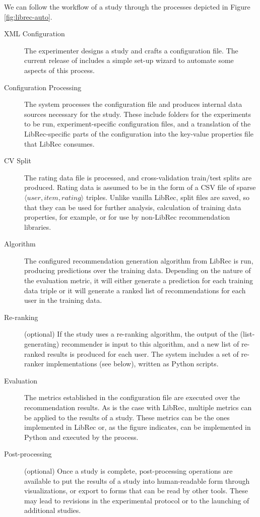 We can follow the workflow of a study through the processes depicted in Figure \ref{fig:librec-auto}.

\begin{description}

    \item [XML Configuration] The experimenter designs a study and crafts a configuration file. The current release of \libauto{} includes a simple set-up wizard to automate some aspects of this process.

    \item [Configuration Processing] The system processes the configuration file and produces internal data sources necessary for the study. These include folders for the experiments to be run, experiment-specific configuration files, and a translation of the LibRec-specific parts of the configuration into the key-value properties file that LibRec consumes.

    \item [CV Split] The rating data file is processed, and cross-validation train/test splits are produced. Rating data is assumed to be in the form of a CSV file of sparse $\langle user, item, rating \rangle$ triples. Unlike vanilla LibRec, split files are saved, so that they can be used for further analysis, calculation of training data properties, for example, or for use by non-LibRec recommendation libraries.

    \item [Algorithm] The configured recommendation generation algorithm from LibRec is run, producing predictions over the training data. Depending on the nature of the evaluation metric, it will either generate a prediction for each training data triple or it will generate a ranked list of recommendations for each user in the training data. 
    
    \item [Re-ranking] (optional) If the study uses a re-ranking algorithm, the output of the (list-generating) recommender is input to this algorithm, and a new list of re-ranked results is produced for each user. The system includes a set of re-ranker implementations (see below), written as Python scripts. 

    \item [Evaluation] The metrics established in the configuration file are executed over the recommendation results. As is the case with LibRec, multiple metrics can be applied to the results of a study. These metrics can be the ones implemented in LibRec or, as the figure indicates, can be implemented in Python and executed by the \libauto{} process.

    \item [Post-processing] (optional) Once a study is complete, post-processing operations are available to put the results of a study into human-readable form through visualizations, or export to forms that can be read by other tools. These may lead to revisions in the experimental protocol or to the launching of additional studies.

\end{description}

